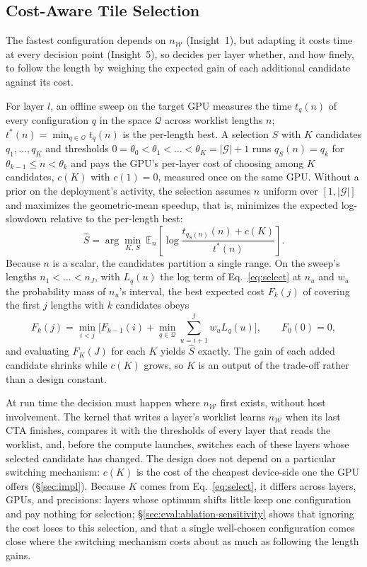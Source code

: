 \subsection{Cost-Aware Tile Selection}
\label{sec:design:select}

The fastest configuration depends on $n_{\mathcal{W}}$ (Insight~1), but
adapting it costs time at every decision point (Insight~5), so \sysname decides per layer whether, and how
finely, to follow the length by weighing the expected gain of each additional
candidate against its cost.

For layer $l$, an offline sweep on the target GPU measures the time $t_q(n)$
of every configuration $q$ in the space $\mathcal{Q}$ across worklist lengths
$n$; $t^{*}(n)=\min_{q\in\mathcal{Q}}t_q(n)$ is the per-length best. A
selection $S$ with $K$ candidates $q_1,\dots,q_K$ and thresholds
$0=\theta_0<\theta_1<\dots<\theta_K=|\mathcal{G}|+1$ runs $q_S(n)=q_k$ for
$\theta_{k-1}\le n<\theta_k$ and pays the GPU's per-layer cost of choosing
among $K$ candidates, $c(K)$ with $c(1)=0$, measured once on the same GPU.
Without a prior on the deployment's activity, the selection assumes $n$
uniform over $[1,|\mathcal{G}|]$ and maximizes the geometric-mean speedup, that
is, minimizes the expected log-slowdown relative to the per-length best:
\begin{equation}
  \hat{S}=\arg\min_{K,\,S}\ \mathbb{E}_{n}\!\left[\log
  \frac{t_{q_S(n)}(n)+c(K)}{t^{*}(n)}\right].
  \label{eq:select}
\end{equation}
Because $n$ is a scalar, the candidates partition a single range. On the
sweep's lengths $n_1<\dots<n_J$, with $L_q(u)$ the log term of
Eq.~\ref{eq:select} at $n_u$ and $w_u$ the probability mass of $n_u$'s
interval, the best expected cost $F_k(j)$ of covering the first $j$ lengths with
$k$ candidates obeys
\begin{equation}
  F_k(j)=\min_{i<j}\Big[F_{k-1}(i)+\min_{q\in\mathcal{Q}}\sum_{u=i+1}^{j}w_uL_q(u)\Big],
  \qquad F_0(0)=0,
  \label{eq:select-dp}
\end{equation}
and evaluating $F_K(J)$ for each $K$ yields $\hat{S}$ exactly. The gain of each
added candidate shrinks while $c(K)$ grows, so $K$ is an output of the
trade-off rather than a design constant.

At run time the decision must happen where $n_{\mathcal{W}}$ first exists,
without host involvement. The kernel that writes a layer's worklist learns
$n_{\mathcal{W}}$ when its last CTA finishes, compares it with the thresholds
of every layer that reads the worklist, and, before the compute launches,
switches each of these layers whose selected candidate has changed. The design
does not depend on a particular switching mechanism: $c(K)$ is the cost of the
cheapest device-side one the GPU offers (\S\ref{sec:impl}). Because $K$ comes
from Eq.~\ref{eq:select}, it differs across layers, GPUs, and precisions: layers whose optimum shifts little keep
one configuration and pay nothing for selection;
\S\ref{sec:eval:ablation-sensitivity} shows that ignoring the cost loses to
this selection, and that a single well-chosen configuration comes close where
the switching mechanism costs about as much as following the length gains.
